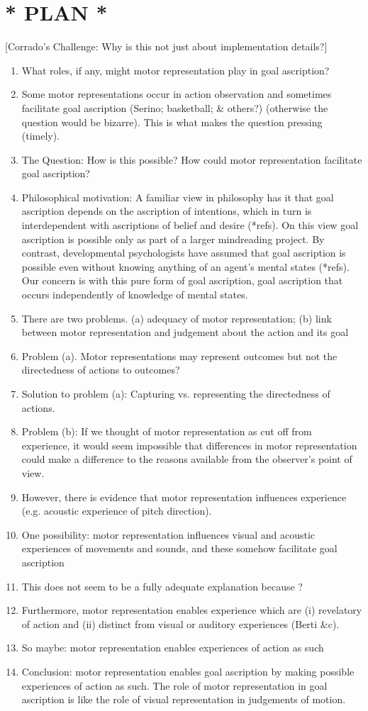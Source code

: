 \documentclass[12pt,\papersize]{extarticle}
\begin{document}
\section{* PLAN *}
[Corrado's Challenge: Why is this not just about implementation details?]
\begin{enumerate}
\item What roles, if any, might motor representation play in goal ascription?
\item Some motor representations occur in action observation and sometimes facilitate goal ascription (Serino; basketball; \& others?) (otherwise the question would be bizarre).  This is what makes the question pressing (timely).
\item The Question: How is this possible?  How could motor representation facilitate goal ascription?
\item Philosophical motivation: A familiar view in philosophy has it that goal ascription depends on the ascription of intentions, which in turn is interdependent with ascriptions of belief and desire (*refs). On this view goal ascription is possible only as part of a larger mindreading project. By contrast, developmental psychologists have assumed that goal ascription is possible even without knowing anything of an agent's mental states (*refs).  Our concern is with this pure form of goal ascription, goal ascription that occurs independently of knowledge of mental states.
\item There are two problems.  (a) adequacy of motor representation; (b) link between motor representation and judgement about the action and its goal
\item Problem (a).  Motor representations may represent outcomes but not the directedness of actions to outcomes?
\item Solution to problem (a): Capturing vs. representing the directedness of actions.
\item Problem (b): If we thought of motor representation as cut off from experience, it would seem impossible that differences in motor representation could make a difference to the reasons available from the observer's point of view.  
\item However, there is evidence that motor representation influences experience (e.g. acoustic experience of pitch direction).
\item One possibility: motor representation influences visual and acoustic experiences of movements and sounds, and these somehow facilitate goal ascription
\item This does not seem to be a fully adequate explanation because ?
\item Furthermore, motor representation enables experience which are (i) revelatory of action and (ii) distinct from visual or auditory experiences (Berti \&c).
\item So maybe: motor representation enables experiences of action as such
\item Conclusion: motor representation enables goal ascription by making possible experiences of action as such.  The role of motor representation in goal ascription is like the role of visual representation in judgements of motion.
\end{enumerate}
\end{document}
